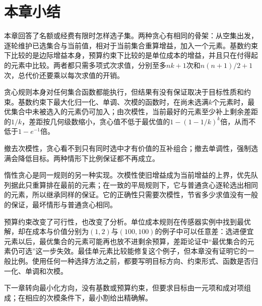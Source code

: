 \FloatBarrier
\section{本章小结}
\label{sec:subset-selection-chapter-summary}

本章回答了名额或经费有限时怎样选子集。两种贪心有相同的骨架：从空集出发，逐轮维护已选集合与当前值，相对于当前集合重算增益，加入一个元素。基数约束下比较的是边际增益本身，预算约束下比较的是单位成本的增益，并且只在付得起的元素中比较。两者都只需多项式次求值，分别至多$nk+1$次和$n(n+1)/2+1$次，总代价还要乘以每次求值的开销。

贪心规则本身对任何集合函数都能执行，但结果有没有保证取决于目标性质和约束。基数约束下最大化归一化、单调、次模的函数时，在尚未选满$k$个元素时，最优集合中未被选入的元素仍可加入；由次模性，当前最好的元素至少补上剩余差距的$1/k$，差距按几何级数缩小，贪心值不低于最优值的$1-(1-1/k)^k$倍，从而不低于$1-e^{-1}$倍。

撤去次模性，贪心看不到只有同时选中才有价值的互补组合；撤去单调性，强制选满会降低目标。两种情形下比例保证都不再成立。

惰性贪心是同一规则的另一种实现。次模性使旧增益成为当前增益的上界，优先队列据此只重算排在最前的元素；在一致的平局规则下，它与普通贪心逐轮选出相同的元素，所以继承同样的保证。它的正确性只需要次模性，节省多少求值没有一般的保证，最坏情形与普通贪心相同。

预算约束改变了可行性，也改变了分析。单位成本规则在传感器实例中找到最优解，却在成本与价值分别为$(1,2)$与$(100,100)$的例子中可以任意差：选进便宜元素以后，最优集合的元素可能再也放不进剩余预算，差距论证中“最优集合的元素仍可选”这一步失效。最佳单元素比较能修复这个例子，但本章没有证明它的一般比例。使用任何一种选择方法之前，都要写明目标方向、约束形式、函数是否归一化、单调和次模。

下一章转向最小化方向，没有基数或预算约束，但要求目标由一元项和成对项组成；在相应的次模条件下，最小割给出精确解。
